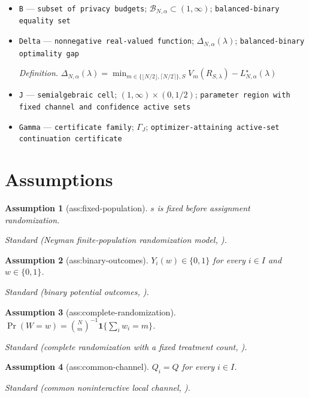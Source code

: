 \documentclass{article}
\newtheorem{assumption}{Assumption}
\begin{document}
\begin{itemize}
  \item \texttt{B} --- \texttt{subset of privacy budgets}; \(\mathcal B_{N,\alpha}\subset(1,\infty)\); \texttt{balanced-\allowbreak{}binary equality set}
  \item \texttt{Delta} --- \texttt{nonnegative real-\allowbreak{}valued function}; \(\Delta_{N,\alpha}(\lambda)\); \texttt{balanced-\allowbreak{}binary optimality gap}
  \par\smallskip\noindent\emph{Definition.} \(\Delta_{N,\alpha}(\lambda)=\min_{m\in\{\lfloor N/2\rfloor,\lceil N/2\rceil\},S}V_m(R_{S,\lambda})-L^\star_{N,\alpha}(\lambda)\)
  \item \texttt{J} --- \texttt{semialgebraic cell}; \((1,\infty)\times(0,1/2)\); \texttt{parameter region with fixed channel and confidence active sets}
  \item \texttt{Gamma} --- \texttt{certificate family}; \(\Gamma_J\); \texttt{optimizer-\allowbreak{}attaining active-\allowbreak{}set continuation certificate}
\end{itemize}

\section{Assumptions}

\begin{assumption}[ass:fixed-population]\label{ass:fixed-population}
\(s\) is fixed before assignment randomization.
\par\smallskip\noindent\emph{Standard} (Neyman finite-population randomization model, \cite{RigdonHudgens2015}).
\end{assumption}

\begin{assumption}[ass:binary-outcomes]\label{ass:binary-outcomes}
\(Y_i(w)\in\{0,1\}\) for every \(i\in I\) and \(w\in\{0,1\}\).
\par\smallskip\noindent\emph{Standard} (binary potential outcomes, \cite{RigdonHudgens2015}).
\end{assumption}

\begin{assumption}[ass:complete-randomization]\label{ass:complete-randomization}
\(\Pr(W=w)=\binom{N}{m}^{-1}\mathbf 1\{\sum_iw_i=m\}\).
\par\smallskip\noindent\emph{Standard} (complete randomization with a fixed treatment count, \cite{RigdonHudgens2015}).
\end{assumption}

\begin{assumption}[ass:common-channel]\label{ass:common-channel}
\(Q_i=Q\) for every \(i\in I\).
\par\smallskip\noindent\emph{Standard} (common noninteractive local channel, \cite{KairouzOhViswanath2016}).
\end{assumption}
\end{document}
